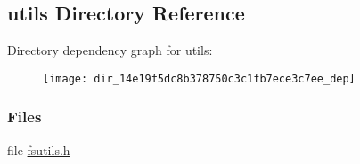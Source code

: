 \subsection{utils Directory Reference}
\label{dir_14e19f5dc8b378750c3c1fb7ece3c7ee}
Directory dependency graph for utils\+:
\nopagebreak
\begin{figure}[H]
\begin{center}
\leavevmode
\texttt{[image: dir\_14e19f5dc8b378750c3c1fb7ece3c7ee\_dep]}
\end{center}
\end{figure}
\subsubsection*{Files}
\begin{DoxyCompactItemize}
\item 
file \hyperlink{fsutils_8h}{fsutils.\+h}
\end{DoxyCompactItemize}

